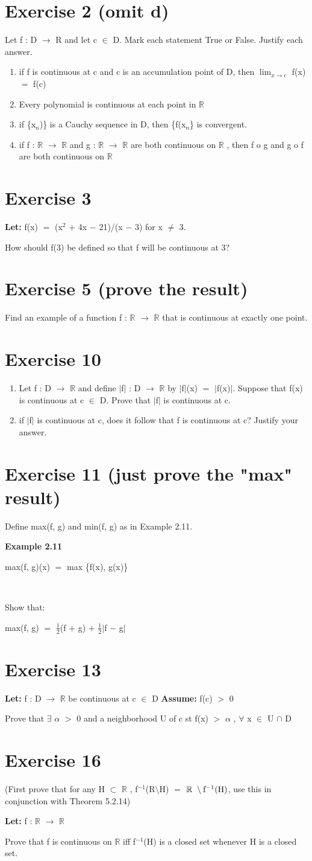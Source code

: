 \documentclass{article}
\newcommand{\mt}[1]{\ensuremath{#1}}
\newcommand\bsc[2][\DefaultOpt]{%
  \def\DefaultOpt{#2}%
  \section[#1]{#2}%
}
\newcommand{\balist}{\begin{enumerate}[label=\alph*.]}
\newcommand{\elist}{\end{enumerate}}
\newcommand{\lt}[1]{\textbf{Let: } #1}
\newcommand{\as}[1]{\textbf{Assume: } #1}
\newcommand{\br}{\mt{\mathbb{R}} }       %
\newcommand{\fa}{\mt{\forall} }          %
\newcommand{\afa}{\mt{\alpha} }
\newcommand{\mem}{\mt{\in} }
\newcommand{\exs}{\mt{\exists} }
\newcommand{\sbs}{\mt{\subset} }         %
\newcommand{\lra}{ \mt{\longrightarrow} } %
\newcommand{\av}[1]{\mt{|}#1\mt{|}}  %
\newcommand{\prn}[1]{(#1)}
\newcommand{\bk}[1]{\{#1\}}
\newcommand{\ps}{\mt{+} }
\newcommand{\ms}{\mt{-} }
\newcommand{\gr}{\mt{>} }
\newcommand{\eql}{\mt{=} }
\newcommand{\uw}[2]{#1\mt{_{#2}}}
\newcommand{\uf}[2]{#1\mt{^{#2}}}
\newcommand{\frc}[2]{\mt{\frac{#1}{#2}}}
\newcommand{\limt}[2]{\mt{\displaystyle{\lim_{#1 \to #2}}}}
\newcommand{\bnt}[2]{\mt{\textrm{#1}\setminus{\textrm{#2}}}}
\newcommand{\inn}{\mt{\cap} }
\begin{document}
\bsc{Exercise 2 (omit d)}{

Let f : D \lra R and let c \mem D. Mark each statement True or False. Justify each answer.

\balist
\item if f is continuous at c and c is an accumulation point of D, then \limt{x}{c} f(x) \eql f(c)
\item Every polynomial is continuous at each point in \br
\item if \bk{\uw{x}{n})} is a Cauchy sequence in D, then \bk{f(\uw{x}{n}} is convergent.
\item if f : \br \lra \br and g : \br \lra \br are both continuous on \br, then f o g and g o f are both continuous on \br
\elist
}

\bsc{Exercise 3}{

\lt{f(x) \eql \prn{\uf{x}{2} \ps 4x \ms 21}/\prn{x \ms 3} for x $\neq$ 3.}

How should f(3) be defined so that f will be continuous at 3?

}

\bsc{Exercise 5 (prove the result)}{

Find an example of a function f : \br \lra \br that is continuous at exactly one point.

}

\bsc{Exercise 10}{

\balist
\item Let f : D \lra \br and define \av{f} : D \lra \br by \av{f}(x) \eql \av{f(x)}. Suppose that f(x) is continuous at c \mem D. Prove that \av{f} is continuous at c.
\item if \av{f} is continuous at c, does it follow that f is continuous at c? Justify your answer.
\elist

}

\bsc{Exercise 11 (just prove the "max" result)}{

Define max(f, g) and min(f, g) as in Example 2.11. 

\textbf{Example 2.11}

max(f, g)(x) \eql max \bk{f(x), g(x)}

\

Show that:

max(f, g) \eql \frc{1}{2}(f \ps g) \ps \frc{1}{2}\av{f \ms g}


}

\bsc{Exercise 13}{

\lt{f : D \lra \br be continuous at c \mem D}
\as{f(c) \gr 0}

Prove that \exs \afa \gr 0 and a neighborhood U of c st f(x) \gr \afa, \fa x \mem U \inn D

}

\bsc{Exercise 16}{

(First prove that for any H \sbs \br, \uf{f}{-1}(\bnt{R}{H}) \eql \bnt{\br}{\uf{f}{-1}(H)}, use this in conjunction with Theorem 5.2.14)

\lt{f : \br \lra \br}

Prove that f is continuous on \br iff \uf{f}{-1}(H) is a closed set whenever H is a closed set.

}
\end{document}
